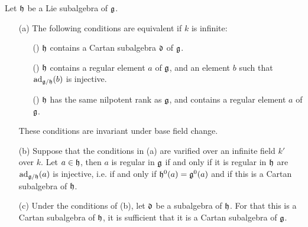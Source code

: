 \begin{proposition}\label{scheme group Lie subalgebra contain Cartan subalgebra iff}
Let $\mathfrak{h}$ be a Lie subalgebra of $\mathfrak{g}$.
\begin{enumerate}
    \item[(a)] The following conditions are equivalent if $k$ is infinite:
    \begin{enumerate}
        \item[(\rmnum{1})] $\mathfrak{h}$ contains a Cartan subalgebra $\mathfrak{d}$ of $\mathfrak{g}$.
        \item[(\rmnum{2})] $\mathfrak{h}$ contains a regular element $a$ of $\mathfrak{g}$, and an element $b$ such that $\mathrm{ad}_{\mathfrak{g}/\mathfrak{h}}(b)$ is injective.
        \item[(\rmnum{3})] $\mathfrak{h}$ has the same nilpotent rank as $\mathfrak{g}$, and contains a regular element $a$ of $\mathfrak{g}$.  
    \end{enumerate}
    These conditions are invariant under base field change.
    \item[(b)] Suppose that the conditions in (a) are varified over an infinite field $k'$ over $k$. Let $a\in\mathfrak{h}$, then $a$ is regular in $\mathfrak{g}$ if and only if it is regular in $\mathfrak{h}$ are $\mathrm{ad}_{\mathfrak{g}/\mathfrak{h}}(a)$ is injective, i.e. if and only if $\mathfrak{h}^0(a)=\mathfrak{g}^0(a)$ and if this is a Cartan subalgebra of $\mathfrak{h}$.
    \item[(c)] Under the conditions of (b), let $\mathfrak{d}$ be a subalgebra of $\mathfrak{h}$. For that this is a Cartan subalgebra of $\mathfrak{h}$, it is sufficient that it is a Cartan subalgebra of $\mathfrak{g}$. 
\end{enumerate}
\end{proposition}
